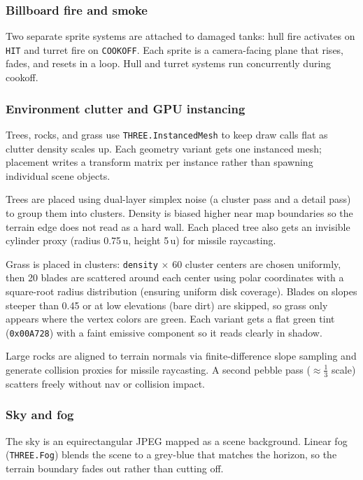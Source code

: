 \documentclass[11pt, a4paper]{article}
\begin{document}
	\subsubsection{Billboard fire and smoke}
	Two separate sprite systems are attached to damaged tanks: hull fire activates on
	\texttt{HIT} and turret fire on \texttt{COOKOFF}. Each sprite is a camera-facing plane
	that rises, fades, and resets in a loop. Hull and turret systems run concurrently during
	cookoff.

	\subsubsection{Environment clutter and GPU instancing}
	Trees, rocks, and grass use \texttt{THREE.InstancedMesh} to keep draw calls flat as
	clutter density scales up. Each geometry variant gets one instanced mesh; placement
	writes a transform matrix per instance rather than spawning individual scene objects.

	Trees are placed using dual-layer simplex noise (a cluster pass and a detail pass) to
	group them into clusters. Density is biased higher near map boundaries so the terrain
	edge does not read as a hard wall. Each placed tree also gets an invisible cylinder
	proxy (radius 0.75\,u, height 5\,u) for missile raycasting.

	Grass is placed in clusters: \texttt{density} $\times$ 60 cluster centers are chosen
	uniformly, then 20 blades are scattered around each center using polar coordinates with
	a square-root radius distribution (ensuring uniform disk coverage). Blades on slopes
	steeper than 0.45 or at low elevations (bare dirt) are skipped, so grass only appears
	where the vertex colors are green. Each variant gets a flat green tint
	(\texttt{0x00A728}) with a faint emissive component so it reads clearly in shadow.

	Large rocks are aligned to terrain normals via finite-difference slope sampling and
	generate collision proxies for missile raycasting. A second pebble pass
	($\approx\frac{1}{3}$ scale) scatters freely without nav or collision impact.

	\subsubsection{Sky and fog}
	The sky is an equirectangular JPEG mapped as a scene background. Linear fog
	(\texttt{THREE.Fog}) blends the scene to a grey-blue that matches the horizon, so the
	terrain boundary fades out rather than cutting off.
\end{document}
